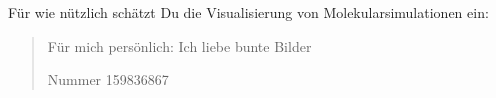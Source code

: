 Für wie nützlich schätzt Du die Visualisierung von Molekularsimulationen ein: \blockquote[Nummer 159836867]{Für mich persönlich: Ich liebe bunte Bilder}



\printbibliography[heading=bibintoc]\label{sec:bibliography}

\printindex %

